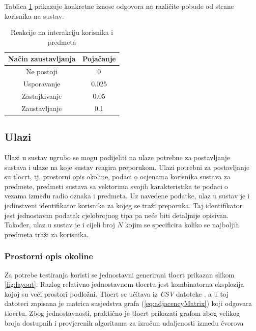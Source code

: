 \documentclass[times, utf8, diplomski, numeric]{fer}
\begin{document}
Tablica \ref{tbl:reinforcement} prikazuje konkretne iznose odgovora na različite
pobude od strane korisnika na sustav.

\begin{table}[!htb]
	\caption{Reakcije na interakciju korisnika i predmeta}
	\label{tbl:reinforcement}
	\centering
	\begin{tabular}{|c|c|} \hline		
		Način zaustavljanja & Pojačanje\\ \hline
		Ne postoji & 0\\
		Usporavanje & 0.025\\
		Zastajkivanje & 0.05\\
		Zaustavljanje & 0.1\\ \hline
	\end{tabular}
\end{table}


\subsection{Ulazi}
Ulazi u sustav ugrubo se mogu podijeliti na ulaze potrebne za postavljanje
sustava i ulaze na koje sustav reagira preporukom. Ulazi potrebni za
postavljanje su tlocrt, tj. prostorni opis okoline, podaci o ocjenama korisnika
sustava za predmete, predmeti sustava sa vektorima svojih karakteristika te
podaci o vezama između radio oznaka i predmeta. Uz navedene podatke, ulaz u
sustav je i jedinstveni identifikator korisnika za kojeg se traži preporuka. Taj
identifikator jest jednostavan podatak cjelobrojnog tipa pa neće biti detaljnije
opisivan. Također, ulaz u sustav je i cijeli broj $N$ kojim se specificira
koliko se najboljih predmeta traži za korisnika.

\subsubsection{Prostorni opis okoline}
Za potrebe testiranja koristi se jednostavni generirani tlocrt prikazan slikom
\ref{fig:layout}. Razlog relativno jednostavnom tlocrtu jest kombinatorna
eksplozija kojoj su veći prostori podložni. Tlocrt se učitava iz \emph{CSV}
datoteke , a u toj datoteci zapisana je matrica
susjedstva grafa (\ref{eq:adjacencyMatrix}) koji odgovara tlocrtu. Zbog
jednostavnosti, praktično je tlocrt prikazati grafom zbog velikog broja
dostupnih i provjerenih algoritama za izračun udaljenosti između čvorova
\end{document}
